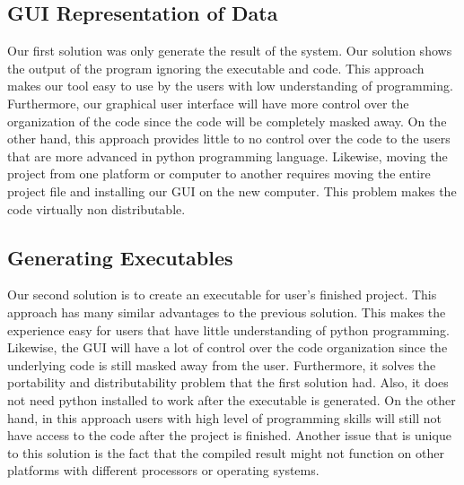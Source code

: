 \documentclass[journal,10pt,onecolumn,compsoc]{IEEEtran} \usepackage[margin=1.0in]{geometry} \usepackage{pdfpages} \usepackage{graphicx}
\begin{document}
\subsection{GUI Representation of Data}
Our first solution was only generate the result of the system. 
Our solution shows the output of the program ignoring the executable and code. 
This approach makes our tool easy to use by the users with low understanding of  programming. 
Furthermore, our graphical user interface will have more control over the organization of the code since the code will be completely masked away. 
On the other hand, this approach provides little to no control over the code to the users that are more advanced in python programming language. 
Likewise, moving the project from one platform or computer to another requires moving the entire project file and installing our GUI on the new computer. 
This problem makes the code virtually non distributable.

\subsection{Generating Executables}
Our second solution is to create an executable for user’s finished project. 
This approach has many similar advantages to the previous solution. 
This makes the experience easy for users that have little understanding of python programming. 
Likewise, the GUI will have a lot of control over the code organization since the underlying code is still masked away from the user. 
Furthermore, it solves the portability and distributability problem that the first solution had. 
Also, it does not need python installed to work after the executable is generated. 
On the other hand, in this approach users with high level of programming skills will still not have access to the code after the project is finished. 
Another issue that is unique to this solution is the fact that the compiled result might not function on other platforms with different processors or operating systems.
\end{document}
